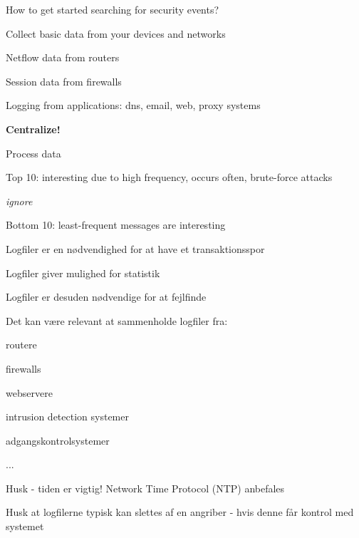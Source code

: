 \documentclass[Screen16to9,17pt]{foils}
\begin{document}

\begin{list1}
\item How to get started searching for security events?
\item Collect basic data from your devices and networks
\begin{list2}
\item Netflow data from routers
\item Session data from firewalls
\item Logging from applications: dns, email, web, proxy systems
\end{list2}
\item {\bf Centralize!}
\item Process data
\begin{list2}
\item Top 10: interesting due to high frequency, occurs often, brute-force attacks
\item {\it ignore}
\item Bottom 10: least-frequent messages are interesting
\end{list2}
\end{list1}



\begin{list1}
\item Logfiler er en nødvendighed for at have et transaktionsspor
\item Logfiler giver mulighed for statistik
\item Logfiler er desuden nødvendige for at fejlfinde
\item Det kan være relevant at sammenholde logfiler fra:
\begin{list2}
\item routere
\item firewalls
\item webservere
\item intrusion detection systemer
\item adgangskontrolsystemer
\item ...
\end{list2}
\item Husk - tiden er vigtig! Network Time Protocol (NTP) anbefales
\item Husk at logfilerne typisk kan slettes af en angriber -
  hvis denne får kontrol med systemet
\end{list1}

\end{document}
